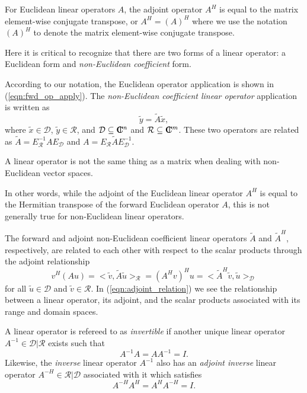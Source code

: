 For Euclidean linear operators $A$, the adjoint operator $A^H$ is equal to the
matrix element-wise conjugate transpose, or $A^H = (A)^H$ where we use the
notation $(A)^H$ to denote the matrix element-wise conjugate transpose.

Here it is critical to recognize that there are two forms of a linear
operator: a Euclidean form and {}\textit{non-Euclidean coefficient} form.

According to our notation, the Euclidean operator application is shown in
(\ref{eqn:fwd_op_apply}).  The {}\textit{non-Euclidean coefficient linear
operator} application is written as
%
\begin{equation}
\tilde{y} = \tilde{A} \tilde{x},
\label{eqn:fwd_op_apply_euclidean}
\end{equation}
%
where $\tilde{x}\in\mathcal{D}$, $\tilde{y}\in\mathcal{R}$, and
$\mathcal{D}\subseteq\mbox{\textbf{C}}\hspace{-1.1ex}\mbox{l}\hspace{0.4ex}^n$ and $\mathcal{R}\subseteq\mbox{\textbf{C}}\hspace{-1.1ex}\mbox{l}\hspace{0.4ex}^m$.  These two
operators are related as $\tilde{A} = E_{\mathcal{R}}^{-1} A E_{\mathcal{D}}$
and $A = E_{\mathcal{R}} {}\tilde{A} E_{\mathcal{D}}^{-1}$.

{}\begin{dumb_fact} A linear operator is not the same thing as a matrix when
dealing with non-Euclidean vector spaces.
{}\end{dumb_fact}

In other words, while the adjoint of the Euclidean linear operator $A^H$ is
equal to the Hermitian transpose of the forward Euclidean operator $A$, this is
not generally true for non-Euclidean linear operators.

The forward and adjoint non-Euclidean coefficient linear operators
$\tilde{A}$ and $\tilde{A}^H$, respectively, are related to each other with
respect to the scalar products through the adjoint relationship
%
\begin{equation}
v^H (A u)
= <\tilde{v},\tilde{A} \tilde{u}>_{\mathcal{R}}
= (A^H v)^H u
= <\tilde{A}^H \tilde{v},\tilde{u}>_{\mathcal{D}}
\label{eqn:adjoint_relation}
\end{equation}
%
for all $\tilde{u}\in\mathcal{D}$ and $\tilde{v}\in\mathcal{R}$.  In
(\ref{eqn:adjoint_relation}) we see the relationship between a linear
operator, its adjoint, and the scalar products associated with its range and
domain spaces.

A linear operator is refereed to as {}\textit{invertible} if another unique
linear operator $A^{-1}\in\mathcal{D}|\mathcal{R}$ exists such that
%
\[
A^{-1} A = A A^{-1} = I.
\]
%
Likewise, the {}\textit{inverse} linear operator $A^{-1}$ also has an
{}\textit{adjoint inverse} linear operator $A^{-H}\in\mathcal{R}|\mathcal{D}$
associated with it which satisfies
%
\[
A^{-H} A^H = A^H A^{-H} = I.
\]
%

